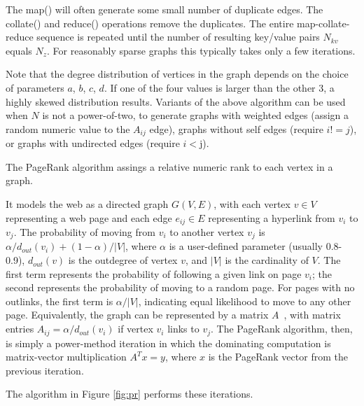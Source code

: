 The map() will often generate some small number of duplicate edges.
The collate() and reduce() operations remove the duplicates.  The
entire map-collate-reduce sequence is repeated until the number of
resulting key/value pairs $N_{kv}$ equals $N_z$.  For reasonably
sparse graphs this typically takes only a few iterations.

Note that the degree distribution of vertices in the graph depends on
the choice of parameters $a$, $b$, $c$, $d$.  If one of the four
values is larger than the other 3, a highly skewed distribution
results.  Variants of the above algorithm can be used when $N$ is not
a power-of-two, to generate graphs with weighted edges (assign a
random numeric value to the $A_{ij}$ edge), graphs without self edges
(require $i != j$), or graphs with undirected edges (require $i < $j).

The PageRank algorithm assings a relative numeric rank to each
vertex in a graph.

It models the web as a directed graph $G(V,E)$, with each vertex $v
\in V$ representing a web page and each edge $e_{ij} \in E$
representing a hyperlink from $v_i$ to $v_j$.  The probability of
moving from $v_i$ to another vertex $v_j$ is $\alpha/d_{out}(v_i) +
(1-\alpha)/|V|$, where $\alpha$ is a user-defined parameter (usually
0.8-0.9), $d_{out}(v)$ is the outdegree of vertex $v$, and $|V|$ is
the cardinality of $V$.  The first term represents the probability of
following a given link on page $v_i$; the second represents the
probability of moving to a random page.  For pages with no outlinks,
the first term is $\alpha/|V|$, indicating equal likelihood to move to
any other page.  Equivalently, the graph can be represented by a
matrix $A$~\cite{LangvilleMeyer05a}, with matrix entries $A_{ij} =
\alpha/d_{out}(v_i)$ if vertex $v_i$ links to $v_j$.  The PageRank
algorithm, then, is simply a power-method iteration in which the
dominating computation is matrix-vector multiplication $A^T x=y$,
where $x$ is the PageRank vector from the previous iteration.

The algorithm in Figure \ref{fig:pr} performs these
iterations.

